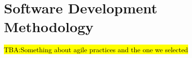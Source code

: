 \let\textcircled=\pgftextcircled
\chapter{Software Development Methodology}
\label{chap:intro}

\hl{TBA:Something about agile practices and the one we selected}